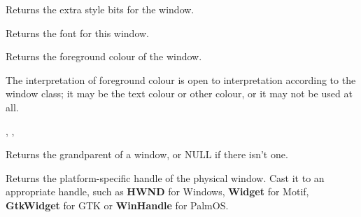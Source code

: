 \label{wxwindowgetextrastyle}


Returns the extra style bits for the window.


\label{wxwindowgetfont}


Returns the font for this window.




\label{wxwindowgetforegroundcolour}


Returns the foreground colour of the window.


The interpretation of foreground colour is open to interpretation according
to the window class; it may be the text colour or other colour, or it may not
be used at all.


,\rtfsp
{},\rtfsp
{}


\label{wxwindowgetgrandparent}


Returns the grandparent of a window, or NULL if there isn't one.


\label{wxwindowgethandle}


Returns the platform-specific handle of the physical window. Cast it to an appropriate
handle, such as {\bf HWND} for Windows, {\bf Widget} for Motif, {\bf GtkWidget} for GTK or {\bf WinHandle} for PalmOS.




\label{wxwindowgethelptextatpoint}

